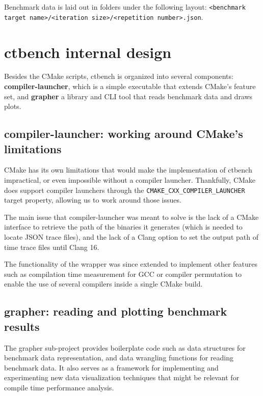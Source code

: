 \documentclass[../main]{subfiles}
\begin{document}
Benchmark data is laid out in folders under the following layout:
\lstinline{<benchmark target name>/<iteration size>/<repetition number>.json}.

\section{
  ctbench internal design
}

Besides the CMake scripts, ctbench is organized into several components:
\textbf{compiler-launcher}, which is a simple executable that extends CMake's
feature set, and \textbf{grapher} a \cpp library and CLI tool that reads
benchmark data and draws plots.

\subsection{
  compiler-launcher: working around CMake's limitations
}

CMake has its own limitations that would make the implementation of ctbench
impractical, or even impossible without a compiler launcher. Thankfully, CMake
does support compiler launchers through the
\lstinline{CMAKE_CXX_COMPILER_LAUNCHER} target property,
allowing us to work around those issues.

The main issue that compiler-launcher was meant to solve is the lack of
a CMake interface to retrieve the path of the binaries it generates (which is
needed to locate JSON trace files), and the lack of a Clang option to set
the output path of time trace files until Clang 16.

The functionality of the wrapper was since extended to implement other features
such as compilation time measurement for GCC or compiler permutation
to enable the use of several \cpp compilers inside a single CMake build.

\subsection{
  grapher: reading and plotting benchmark results
}

The grapher sub-project provides boilerplate code such as data structures
for benchmark data representation, and data wrangling functions for reading
benchmark data. It also serves as a framework for implementing and experimenting
new data visualization techniques that might be relevant for compile time
performance analysis.
\end{document}
